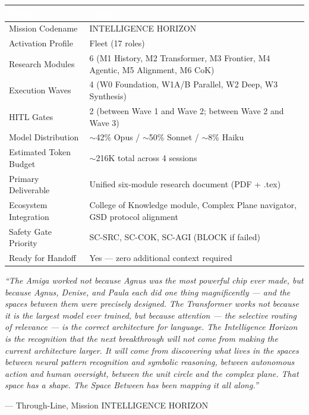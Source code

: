 \documentclass[11pt,letterpaper]{article}
\newcommand{\tableheader}[1]{\textbf{\sffamily\textcolor{white}{#1}}}
\begin{document}
\begin{center}
\begin{tabularx}{\textwidth}{L{5cm}X}
\toprule
{}
\tableheader{Metric} & \tableheader{Value} \\
\midrule
Mission Codename & INTELLIGENCE HORIZON \\
Activation Profile & Fleet (17 roles) \\
Research Modules & 6 (M1 History, M2 Transformer, M3 Frontier, M4 Agentic, M5 Alignment, M6 CoK) \\
Execution Waves & 4 (W0 Foundation, W1A/B Parallel, W2 Deep, W3 Synthesis) \\
HITL Gates & 2 (between Wave 1 and Wave 2; between Wave 2 and Wave 3) \\
Model Distribution & $\sim$42\% Opus / $\sim$50\% Sonnet / $\sim$8\% Haiku \\
Estimated Token Budget & $\sim$216K total across 4 sessions \\
Primary Deliverable & Unified six-module research document (PDF + .tex) \\
Ecosystem Integration & College of Knowledge module, Complex Plane navigator, GSD protocol alignment \\
Safety Gate Priority & SC-SRC, SC-COK, SC-AGI (BLOCK if failed) \\
Ready for Handoff & Yes --- zero additional context required \\
\bottomrule
\end{tabularx}
\end{center}

\vspace{2em}

\begin{quotebox}
\textit{``The Amiga worked not because Agnus was the most powerful chip ever made, but because Agnus, Denise, and Paula each did one thing magnificently --- and the spaces between them were precisely designed. The Transformer works not because it is the largest model ever trained, but because attention --- the selective routing of relevance --- is the correct architecture for language. The Intelligence Horizon is the recognition that the next breakthrough will not come from making the current architecture larger. It will come from discovering what lives in the spaces between neural pattern recognition and symbolic reasoning, between autonomous action and human oversight, between the unit circle and the complex plane. That space has a shape. \textit{The Space Between} has been mapping it all along.''}

\vspace{0.5em}
\hfill --- Through-Line, Mission INTELLIGENCE HORIZON
\end{quotebox}
\end{document}
